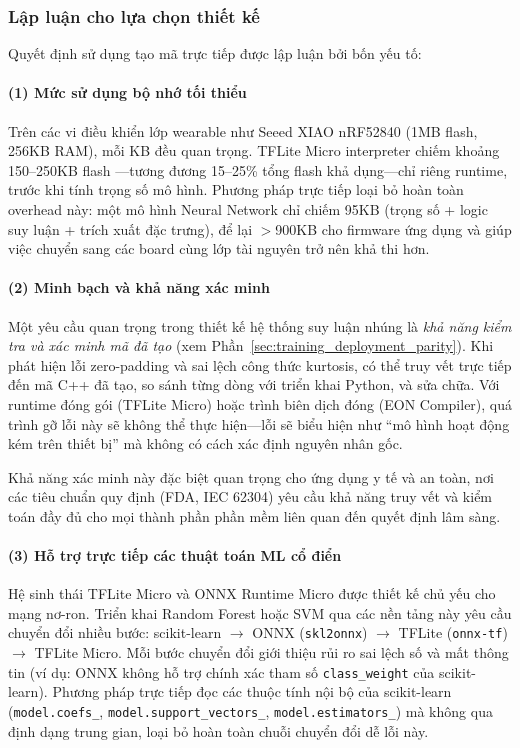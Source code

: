 \subsubsection{Lập luận cho lựa chọn thiết kế}

Quyết định sử dụng tạo mã trực tiếp được lập luận bởi bốn yếu tố:

\paragraph{(1) Mức sử dụng bộ nhớ tối thiểu}
Trên các vi điều khiển lớp wearable như Seeed XIAO nRF52840 (1MB flash, 256KB RAM), mỗi KB đều quan trọng. TFLite Micro interpreter chiếm khoảng 150--250KB flash \cite{warden2019tinyml, ray2023tinyml_survey}---tương đương 15--25\% tổng flash khả dụng---chỉ riêng runtime, trước khi tính trọng số mô hình. Phương pháp trực tiếp loại bỏ hoàn toàn overhead này: một mô hình Neural Network chỉ chiếm 95KB (trọng số + logic suy luận + trích xuất đặc trưng), để lại $>$900KB cho firmware ứng dụng và giúp việc chuyển sang các board cùng lớp tài nguyên trở nên khả thi hơn.

\paragraph{(2) Minh bạch và khả năng xác minh}
Một yêu cầu quan trọng trong thiết kế hệ thống suy luận nhúng là \textit{khả năng kiểm tra và xác minh mã đã tạo} (xem Phần~\ref{sec:training_deployment_parity}). Khi phát hiện lỗi zero-padding và sai lệch công thức kurtosis, có thể truy vết trực tiếp đến mã C++ đã tạo, so sánh từng dòng với triển khai Python, và sửa chữa. Với runtime đóng gói (TFLite Micro) hoặc trình biên dịch đóng (EON Compiler), quá trình gỡ lỗi này sẽ không thể thực hiện---lỗi sẽ biểu hiện như ``mô hình hoạt động kém trên thiết bị'' mà không có cách xác định nguyên nhân gốc.

Khả năng xác minh này đặc biệt quan trọng cho ứng dụng y tế và an toàn, nơi các tiêu chuẩn quy định (FDA, IEC 62304) yêu cầu khả năng truy vết và kiểm toán đầy đủ cho mọi thành phần phần mềm liên quan đến quyết định lâm sàng.

\paragraph{(3) Hỗ trợ trực tiếp các thuật toán ML cổ điển}
Hệ sinh thái TFLite Micro và ONNX Runtime Micro được thiết kế chủ yếu cho mạng nơ-ron. Triển khai Random Forest hoặc SVM qua các nền tảng này yêu cầu chuyển đổi nhiều bước: scikit-learn $\rightarrow$ ONNX (\texttt{skl2onnx}) $\rightarrow$ TFLite (\texttt{onnx-tf}) $\rightarrow$ TFLite Micro. Mỗi bước chuyển đổi giới thiệu rủi ro sai lệch số và mất thông tin (ví dụ: ONNX không hỗ trợ chính xác tham số \texttt{class\_weight} của scikit-learn). Phương pháp trực tiếp đọc các thuộc tính nội bộ của scikit-learn (\texttt{model.coefs\_}, \texttt{model.support\_vectors\_}, \texttt{model.estimators\_}) mà không qua định dạng trung gian, loại bỏ hoàn toàn chuỗi chuyển đổi dễ lỗi này.

